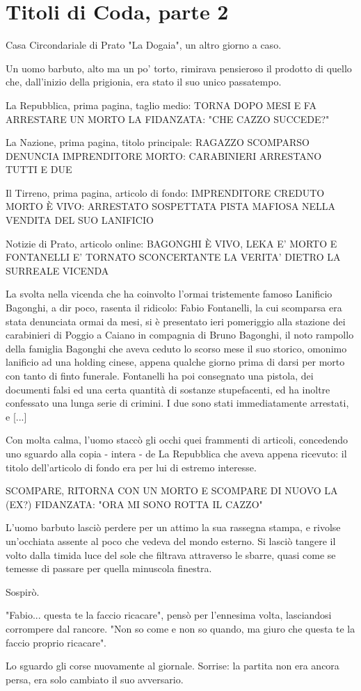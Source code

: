 \chapter{Titoli di Coda, parte 2}

Casa Circondariale di Prato "La Dogaia", un altro giorno a caso.

Un uomo barbuto, alto ma un po' torto, rimirava pensieroso il prodotto di quello che, dall'inizio della prigionia, era stato il suo unico passatempo.

La Repubblica, prima pagina, taglio medio:
TORNA DOPO MESI E FA ARRESTARE UN MORTO
LA FIDANZATA: "CHE CAZZO SUCCEDE?"

La Nazione, prima pagina, titolo principale:
RAGAZZO SCOMPARSO DENUNCIA IMPRENDITORE MORTO: 
CARABINIERI ARRESTANO TUTTI E DUE

Il Tirreno, prima pagina, articolo di fondo:
IMPRENDITORE CREDUTO MORTO È VIVO: ARRESTATO
SOSPETTATA PISTA MAFIOSA NELLA VENDITA DEL SUO LANIFICIO

Notizie di Prato, articolo online:
BAGONGHI È VIVO, LEKA E' MORTO E FONTANELLI E' TORNATO
SCONCERTANTE LA VERITA' DIETRO LA SURREALE VICENDA

La svolta nella vicenda che ha coinvolto l'ormai tristemente famoso Lanificio Bagonghi, a dir poco, rasenta il ridicolo: Fabio Fontanelli, la cui scomparsa era stata denunciata ormai da mesi, si è presentato ieri pomeriggio alla stazione dei carabinieri di Poggio a Caiano in compagnia di Bruno Bagonghi, il noto rampollo della famiglia Bagonghi che aveva ceduto lo scorso mese il suo storico, omonimo lanificio ad una holding cinese, appena qualche giorno prima di darsi per morto con tanto di finto funerale. Fontanelli ha poi consegnato una pistola, dei documenti falsi ed una certa quantità di sostanze stupefacenti, ed ha inoltre confessato una lunga serie di crimini. I due sono stati immediatamente arrestati, e [...]

Con molta calma, l'uomo staccò gli occhi quei frammenti di articoli, concedendo uno sguardo alla copia - intera - de La Repubblica che aveva appena ricevuto: il titolo dell'articolo di fondo era per lui di estremo interesse.

SCOMPARE, RITORNA CON UN MORTO E SCOMPARE DI NUOVO
LA (EX?) FIDANZATA: "ORA MI SONO ROTTA IL CAZZO"

L'uomo barbuto lasciò perdere per un attimo la sua rassegna stampa, e rivolse un'occhiata assente al poco che vedeva del mondo esterno. Si lasciò tangere il volto dalla timida luce del sole che filtrava attraverso le sbarre, quasi come se temesse di passare per quella minuscola finestra. 

Sospirò.

"Fabio... questa te la faccio ricacare", pensò per l'ennesima volta, lasciandosi corrompere dal rancore. "Non so come e non so quando, ma giuro che questa te la faccio proprio ricacare".

Lo sguardo gli corse nuovamente al giornale. Sorrise: la partita non era ancora persa, era solo cambiato il suo avversario.
